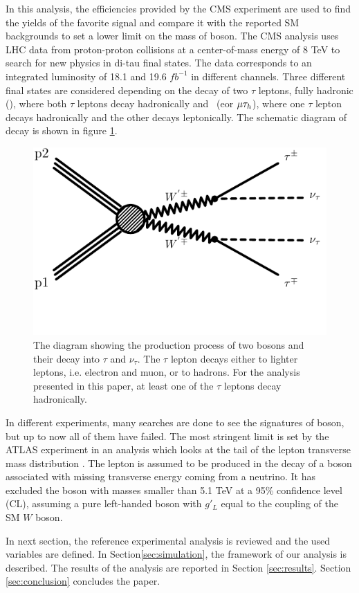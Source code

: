 In this analysis, the efficiencies provided by the CMS experiment \cite{Khachatryan:2016trj} are used to find the yields of the favorite signal and compare it with the reported SM backgrounds to set a lower limit on the mass of \wprime boson. 
The CMS analysis uses LHC data from proton-proton collisions at a center-of-mass energy of 8 TeV to search for new physics in di-tau final states.  The data corresponds to an integrated luminosity of 18.1 and 19.6 $fb^{-1}$ in different channels. Three different final states are considered depending on the decay of two $\tau$ leptons, fully hadronic (\tauTau), where both $\tau$ leptons decay hadronically and \lepTau  ~(e\Tau or $\mu\tau_h$), where one $\tau$ lepton decays hadronically and the other decays leptonically. The schematic diagram of decay is shown in figure \ref{fig:wprimefeyndiagram}.
\begin{figure}[!htb]
  \includegraphics*[width=.45\textwidth]{figs/WpWpTauTau.pdf}
  \caption{The diagram showing the production process of two \wprime bosons and their decay into $\tau$ and $\nu_{\tau}$. The $\tau$ lepton decays either to lighter leptons, i.e. electron and muon, or to hadrons. For the analysis presented in this paper, at least one of the $\tau$ leptons decay hadronically.}
  \label{fig:wprimefeyndiagram}
\end{figure}

In different experiments, many searches are done to see the signatures of \wprime boson, but up to now all of them have failed. The most stringent limit is set by the ATLAS experiment in an analysis which looks at the tail of the lepton transverse mass distribution \cite{Aaboud:2017efa}. The lepton is assumed to be produced in the decay of a \wprime boson associated with missing transverse energy coming from a neutrino. It has excluded the \wprime boson with masses smaller than 5.1 TeV at a 95\% confidence level (CL), assuming a pure left-handed \wprime boson with $g'_L$ equal to the coupling of the SM $W$ boson. 

In next section, the reference experimental analysis is reviewed and the used variables are defined. In Section\ref{sec:simulation}, the framework of our analysis is described. The results of the analysis are reported in Section \ref{sec:results}. Section \ref{sec:conclusion} concludes the paper.
